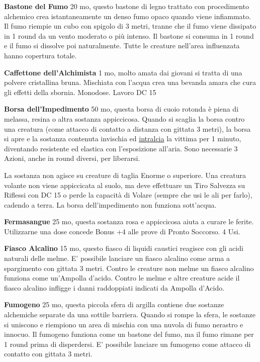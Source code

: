 \begin{multicols}{2}
\textbf{Bastone del Fumo} 20 mo, questo bastone di legno trattato con procedimento alchemico crea istantaneamente un denso fumo opaco quando viene infiammato. Il fumo riempie un cubo con spigolo di 3 metri, tranne che il fumo viene dissipato in 1 round da un vento moderato o più intenso. Il bastone si consuma in 1 round e il fumo si dissolve poi naturalmente. Tutte le creature nell'area influenzata hanno copertura totale.

\textbf{Caffettone dell'Alchimista} 1 mo, molto amata dai giovani si tratta di una polvere cristallina bruna. Mischiata con l'acqua crea una bevanda amara che cura gli effetti della sbornia. Monodose. Lavoro DC 15

\textbf{Borsa dell'Impedimento} 50 mo, questa borsa di cuoio rotonda è piena di melassa, resina o altra sostanza appiccicosa. Quando si scaglia la borsa contro una creatura (come attacco di contatto a distanza con gittata 3 metri), la borsa si apre e la sostanza contenuta invischia ed \hyperlink{intralciato}{intralcia} la vittima per 1 minuto, diventando resistente ed elastica con l'esposizione all'aria. Sono necessarie 3 Azioni, anche in round diversi, per liberarsi.

La sostanza non agisce su creature di taglia Enorme o superiore. Una creatura volante non viene appiccicata al suolo, ma deve effettuare un Tiro Salvezza su Riflessi con DC 15 o perde la capacità di Volare (sempre che usi le ali per farlo), cadendo a terra. La borsa dell'impedimento non funziona sott'acqua.

\textbf{Fermasangue}\hypertarget{Fermasangue}{}\label{fermasangue} 25 mo, questa sostanza rosa e appiccicosa aiuta a curare le ferite. Utilizzarne una dose concede Bonus +4 alle prove di Pronto Soccorso. 4 Usi.

\textbf{Fiasco Alcalino} 15 mo, questo fiasco di liquidi caustici reagisce con gli acidi naturali delle melme. E' possibile lanciare un fiasco alcalino come arma a spargimento con gittata 3 metri. Contro le creature non melme un fiasco alcalino funziona come un'Ampolla d'acido. Contro le melme e altre creature acide il fiasco alcalino infligge i danni raddoppiati indicati da Ampolla d'Acido.

\textbf{Fumogeno} 25 mo, questa piccola sfera di argilla contiene due sostanze alchemiche separate da una sottile barriera. Quando si rompe la sfera, le sostanze si uniscono e riempiono un area di mischia con una nuvola di fumo nerastro e innocuo. Il fumogeno funziona come un bastone del fumo, ma il fumo rimane per 1 round prima di disperdersi. E' possibile lanciare un fumogeno come attacco di contatto con gittata 3 metri.


\end{multicols}

